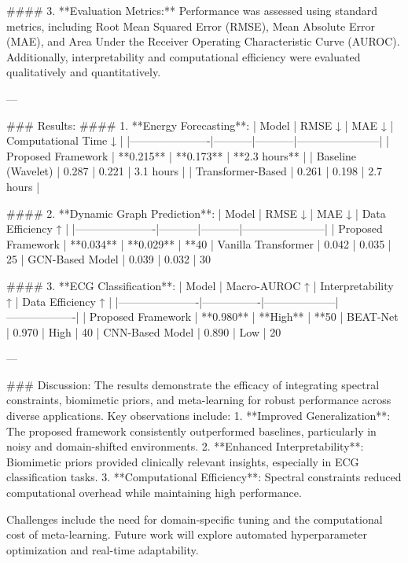 #### 3. **Evaluation Metrics:**
Performance was assessed using standard metrics, including Root Mean Squared Error (RMSE), Mean Absolute Error (MAE), and Area Under the Receiver Operating Characteristic Curve (AUROC). Additionally, interpretability and computational efficiency were evaluated qualitatively and quantitatively.

---

### Results:
#### 1. **Energy Forecasting**:
| Model                | RMSE ↓    | MAE ↓     | Computational Time ↓ |
|----------------------|-----------|-----------|-----------------------|
| Proposed Framework   | **0.215** | **0.173** | **2.3 hours**        |
| Baseline (Wavelet)   | 0.287     | 0.221     | 3.1 hours            |
| Transformer-Based    | 0.261     | 0.198     | 2.7 hours            |

#### 2. **Dynamic Graph Prediction**:
| Model                | RMSE ↓    | MAE ↓     | Data Efficiency ↑    |
|----------------------|-----------|-----------|-----------------------|
| Proposed Framework   | **0.034** | **0.029** | **40%
| Vanilla Transformer  | 0.042     | 0.035     | 25%
| GCN-Based Model      | 0.039     | 0.032     | 30%

#### 3. **ECG Classification**:
| Model                | Macro-AUROC ↑ | Interpretability ↑ | Data Efficiency ↑ |
|----------------------|----------------|--------------------|-------------------|
| Proposed Framework   | **0.980**     | **High**           | **50%
| BEAT-Net             | 0.970         | High               | 40%
| CNN-Based Model      | 0.890         | Low                | 20%

---

### Discussion:
The results demonstrate the efficacy of integrating spectral constraints, biomimetic priors, and meta-learning for robust performance across diverse applications. Key observations include:
1. **Improved Generalization**: The proposed framework consistently outperformed baselines, particularly in noisy and domain-shifted environments.
2. **Enhanced Interpretability**: Biomimetic priors provided clinically relevant insights, especially in ECG classification tasks.
3. **Computational Efficiency**: Spectral constraints reduced computational overhead while maintaining high performance.

Challenges include the need for domain-specific tuning and the computational cost of meta-learning. Future work will explore automated hyperparameter optimization and real-time adaptability.


